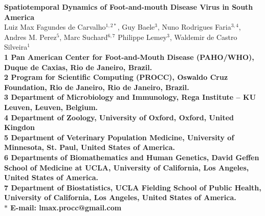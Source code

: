 \documentclass[10pt]{article}
\date{}
\begin{document}
\begin{flushleft}
{\Large
\textbf{Spatiotemporal Dynamics of Foot-and-mouth Disease Virus in South America}
}
\\
Luiz Max Fagundes de Carvalho$^{1,2\ast}$,
Guy Baele$^{3}$,
Nuno Rodrigues Faria$^{3,4}$,
Andres M. Perez$^{5}$,
Marc Suchard$^{6,7}$
Philippe Lemey$^{3}$,
Waldemir de Castro Silveira$^{1}$
\\
\bf{1} Pan American Center for Foot-and-Mouth Disease (PAHO/WHO), Duque de Caxias, Rio de Janeiro, Brazil.
\\
\bf{2} Program for Scientific Computing (PROCC), Oswaldo Cruz Foundation, Rio de Janeiro, Rio de Janeiro, Brazil.
\\
\bf{3} Department of Microbiology and Immunology, Rega Institute -- KU Leuven, Leuven, Belgium.
\\
\bf{4} Department of Zoology, University of Oxford, Oxford, United Kingdon
\\
\bf{5} Department of Veterinary Population Medicine, University of Minnesota, St. Paul, United States of America.
\\
\bf{6} Departments of Biomathematics and Human Genetics, David Geffen School of Medicine at UCLA, University of California, Los Angeles,  United States of America.\\
\bf{7} Department of Biostatistics, UCLA Fielding School of Public Health, University of California, Los Angeles,  United States of America.
\\
$\ast$ E-mail: lmax.procc@gmail.com
\end{flushleft}

\end{document}
